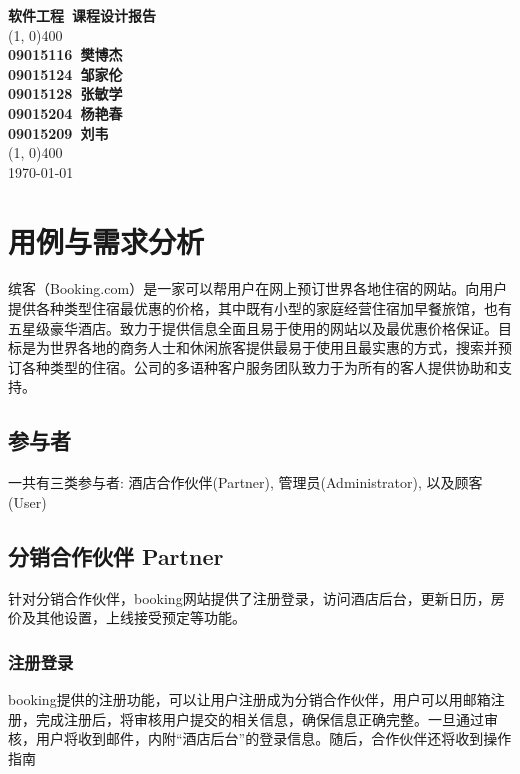 \documentclass[11pt]{article}
\begin{document}
\begin{titlepage}
\begin{center}

	\huge{\textbf{软件工程\ 课程设计报告}}\\

	\vfill
	\line(1, 0){400} \\ [1mm]
	\large{\textbf{09015116\ 樊博杰}} \\ [1mm]
	\large{\textbf{09015124\ 邹家伦}} \\ [1mm]
	\large{\textbf{09015128\ 张敏学}} \\ [1mm]
	\large{\textbf{09015204\ 杨艳春}} \\ [1mm]
	\large{\textbf{09015209\ 刘韦}} \\ [1mm]
	\line(1, 0){400} \\
	\large{\today}\\
\end{center}
\end{titlepage}

\tableofcontents
\thispagestyle{empty}
\clearpage


\setcounter{page}{1}
\section{用例与需求分析}
   缤客（Booking.com）是一家可以帮用户在网上预订世界各地住宿的网站。向用户提供各种类型住宿最优惠的价格，其中既有小型的家庭经营住宿加早餐旅馆，也有五星级豪华酒店。致力于提供信息全面且易于使用的网站以及最优惠价格保证。目标是为世界各地的商务人士和休闲旅客提供最易于使用且最实惠的方式，搜索并预订各种类型的住宿。公司的多语种客户服务团队致力于为所有的客人提供协助和支持。
	\subsection{参与者}
	一共有三类参与者: 酒店合作伙伴(Partner), 管理员(Administrator), 以及顾客(User)
	\subsection{分销合作伙伴 Partner}
		针对分销合作伙伴，booking网站提供了注册登录，访问酒店后台，更新日历，房价及其他设置，上线接受预定等功能。
		\subsubsection{注册登录}
		booking提供的注册功能，可以让用户注册成为分销合作伙伴，用户可以用邮箱注册，完成注册后，将审核用户提交的相关信息，确保信息正确完整。一旦通过审核，用户将收到邮件，内附“酒店后台”的登录信息。随后，合作伙伴还将收到操作指南
\end{document}
